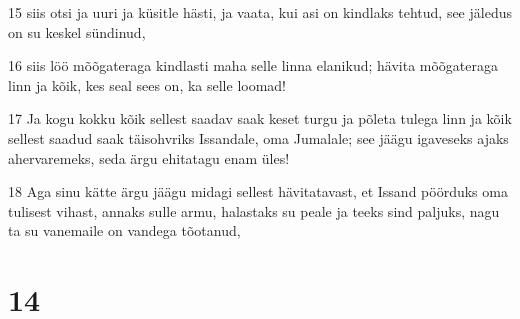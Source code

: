 \par 15 siis otsi ja uuri ja küsitle hästi, ja vaata, kui asi on kindlaks tehtud, see jäledus on su keskel sündinud,
\par 16 siis löö mõõgateraga kindlasti maha selle linna elanikud; hävita mõõgateraga linn ja kõik, kes seal sees on, ka selle loomad!
\par 17 Ja kogu kokku kõik sellest saadav saak keset turgu ja põleta tulega linn ja kõik sellest saadud saak täisohvriks Issandale, oma Jumalale; see jäägu igaveseks ajaks ahervaremeks, seda ärgu ehitatagu enam üles!
\par 18 Aga sinu kätte ärgu jäägu midagi sellest hävitatavast, et Issand pöörduks oma tulisest vihast, annaks sulle armu, halastaks su peale ja teeks sind paljuks, nagu ta su vanemaile on vandega tõotanud,

\chapter{14}

